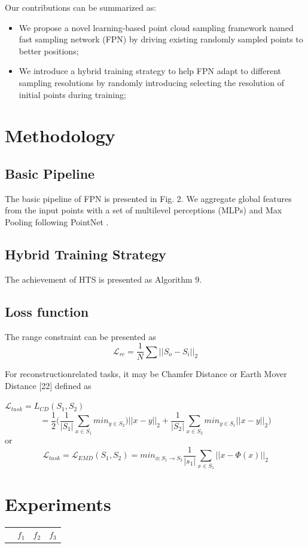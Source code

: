 \documentclass[14pt]{article}
\begin{document}
\begin{multicols}{2}
Our contributions can be summarized as:
\begin{itemize}
	\item We propose a novel learning-based point cloud sampling
framework named fast sampling network (FPN) by driving existing randomly sampled points to better positions;
    \item We introduce a hybrid training strategy to help FPN adapt to
different sampling resolutions by randomly introducing selecting the resolution of initial points during training;
\end{itemize}

\section{Methodology}
\subsection{Basic Pipeline}
The basic pipeline of FPN is presented in Fig. 2. We aggregate global features from the input points with a set of multilevel perceptions (MLPs) and Max Pooling following PointNet \cite{qi2017pointnet}.
\subsection{Hybrid Training Strategy}
The achievement of HTS is presented as Algorithm 9.
\subsection{Loss function}
The range constraint can be presented as
\begin{equation}
	\mathcal{L}_{rc}=\frac{1}{N}\sum||S_o-S_i||_2
\end{equation}

For reconstructionrelated tasks, it may be Chamfer Distance or Earth Mover Distance [22] defined as\\

\raggedright{$\mathcal{L}_{task}=L_{CD}(S_1,S_2)$}
\begin{equation}
	=\frac{1}{2}\Biggl(\frac{1}{|S_1|}\sum_{x\in S_1} min_{y\in S_2})||x-y||_2+\frac{1}{|S_2|}\sum_{x\in S_2}min_{y\in S_1}||x-y||_2\Biggr)
\end{equation}
or
\begin{equation}
	\mathcal{L}_{task}=\mathcal{L}_{EMD}(S_1,S_2)=min_{\phi ;S_1\rightarrow S_2}\frac{1}{|s_1|}\sum_{x \in S_1}||x-\Phi(x)||_2
\end{equation}

\section{Experiments}
\begin{table}
    \centering
    \begin{tabular}{cccc}
    	&$f_1$&$f_2$&$f_3$\\

    \end{tabular}

\end{table}



\printbibliography
\end{multicols}
\end{document}
